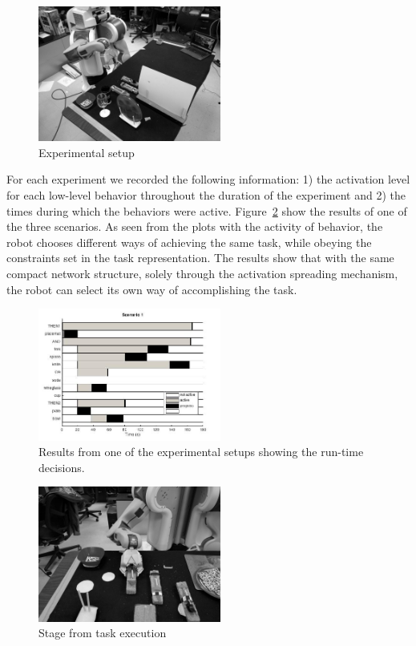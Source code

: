 \documentclass[conference]{article}
\begin{document}
\begin{figure}
\centering
  \includegraphics[width=6cm]{bw_task_environment}
\caption{Experimental setup}
\label{fig:setup}       %
\end{figure}


For each experiment we recorded the following information: 1) the activation level for each low-level behavior throughout the duration of the experiment and 2) the times during which the behaviors were active. Figure~\ref{fig:results} show the results of one of the three scenarios. As seen from the plots with the activity of behavior, the robot chooses different ways of achieving the same task, while obeying the constraints set in the task representation. The results show that with the same compact network structure, solely through the activation spreading mechanism, the robot can select its own way of accomplishing the task.

\begin{figure}
\centering
  \includegraphics[width=6cm]{scenario1}
\caption{Results from one of the experimental setups showing the run-time decisions.}
\label{fig:results}       %
\end{figure}
\begin{figure}
\centering
  \includegraphics[width=6cm]{environment}
\caption{Stage from task execution}
\label{fig:task-execution}       %
\end{figure}
\end{document}
